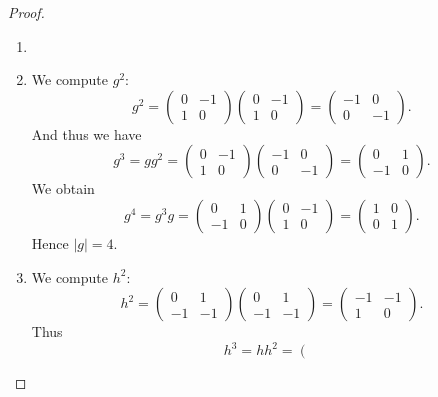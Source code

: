 \documentclass[a4paper, 11pt]{book}
\theoremstyle{plain}
\theoremstyle{plain}
\begin{document}
\begin{proof}
\begin{enumerate}
    \item[]
    \item We compute $g^2$:
    $$g^2=\left(\begin{array}{cc}
0 & -1\\ 1 & 0
\end{array}\right)\left(\begin{array}{cc}
0 & -1\\ 1 & 0
\end{array}\right) = \left(\begin{array}{cc}
-1 & 0\\ 0 & -1
\end{array}\right).$$
And thus we have
    $$g^3=gg^2=\left(\begin{array}{cc}
0 & -1\\ 1 & 0
\end{array}\right)\left(\begin{array}{cc}
-1 & 0\\ 0 & -1
\end{array}\right) = \left(\begin{array}{cc}
0 & 1\\ -1 & 0
\end{array}\right).$$
We obtain 
   $$g^4=g^3g=\left(\begin{array}{cc}
0 & 1\\ -1 & 0
\end{array}\right)\left(\begin{array}{cc}
0 & -1\\ 1 & 0
\end{array}\right) = \left(\begin{array}{cc}
1 & 0\\ 0 & 1
\end{array}\right).$$
Hence $|g|=4$.
\item We compute $h^2$:
    $$h^2=\left(\begin{array}{cc}
0 & 1\\ -1 & -1
\end{array}\right)\left(\begin{array}{cc}
0 & 1\\ -1 & -1
\end{array}\right) = \left(\begin{array}{cc}
-1 & -1\\ 1 & 0
\end{array}\right).$$
Thus
$$h^3=hh^2 = \left(\begin{array}{cc}

\end{array}$$
\end{enumerate}
\end{proof}
\end{document}
